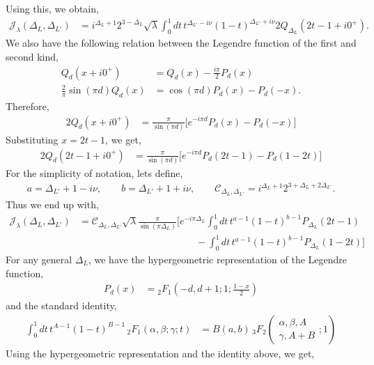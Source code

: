 \documentclass[11pt]{article}
\newcommand{\nn}{\nonumber}
\newcommand{\lb}{\left(}
\newcommand{\rb}{\right)}
\begin{document}
Using this, we obtain,
\begin{align}
    \mathcal{J}_\lambda(\Delta_L,\Delta_{L'}) &= i^{\Delta_L+1} 2^{3-\Delta_L} \sqrt \lambda \int_0^1 dt\,
    t^{\Delta_{L'}-i\nu}(1-t)^{\Delta_{L'}+i\nu}2Q_{\Delta_L}(2t-1+i0^+).
\end{align}
We also have the following relation between the Legendre function of the first and second kind,
\begin{align}
    Q_d(x+ i0^+) &= Q_d(x) - \frac{i \pi }{2}P_d(x) \\
    \frac{2}{\pi} \sin(\pi d) Q_d(x) &= \cos(\pi d) P_d(x) - P_d(-x).
\end{align}
Therefore,
\begin{align}
    2Q_d(x+i0^+) &= \frac{\pi }{\sin (\pi d)} \big[e^{-i\pi d} P_d(x) - P_d(-x) \big]
\end{align}
Substituting $x = 2t-1$, we get,
\begin{align}
    2Q_d(2t- 1+i0^+) &= \frac{\pi }{\sin (\pi d)} \big[e^{-i\pi d} P_d(2t-1) - P_d(1-2t) \big]
\end{align}
For the simplicity of notation, lets define,
\begin{align}
    a = \Delta_{L'}+1-i\nu, \qquad b = \Delta_{L'}+1+i\nu, \qquad \mathcal{C}_{\Delta_L,\Delta_{L'}} = i^{\Delta_L+1}2^{3+ \Delta_L+ 2\Delta_{L'}}.
\end{align}
Thus we end up with,
\begin{align}
    \mathcal{J}_\lambda(\Delta_L,\Delta_{L'}) &= \mathcal{C}_{\Delta_L,\Delta_{L'}} \sqrt \lambda \frac{\pi}{\sin (\pi \Delta_L)} \Big[ e^{-i\pi \Delta_L}\int_0^1 dt\, t^{a-1}(1-t)^{b-1} P_{\Delta_L}(2t-1) \nn \\
    &\qquad\qquad\qquad\qquad\qquad\qquad- \int_0^1 dt \, t^{a-1}(1-t)^{b-1}P_{\Delta_L}(1-2t)\Big]
\end{align}
For any general $\Delta_L$, we have the hypergeometric representation of the Legendre function,
\begin{align}
    P_d(x) &={} _2F_1\lb -d,d+1;1;\frac{1-x}{2}\rb
\end{align}
and the standard identity,
\begin{align}
    \int_0^1 dt\, t^{A-1}(1-t)^{B-1} \,_2F_1\lb \alpha ,\beta;\gamma;t\rb &= B(a,b) \,{}_3F_2\!\left(
\begin{matrix}
\alpha,\beta,A\\
\gamma,A+B
\end{matrix}
;1
\right)
\end{align}
Using the hypergeometric representation and the identity above, we get,
\end{document}
